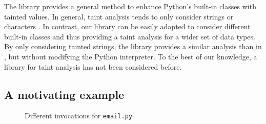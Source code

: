\documentclass[oribibl]{llncs}
\begin{document}
The library provides a general method to enhance Python's built-in
classes with tainted values. 
In general, taint
analysis tends to only consider strings or characters 
\cite{Perl,Nguyen05,Haldar05dynamictaint,KozlovPetukhov07,Futo07,SeoLam2010}.
In contrast, our library 
can be easily adapted to consider different built-in
classes
and thus providing a taint
analysis for a wider set of data types. 
By only considering tainted strings, the library provides 
a similar analysis than in \cite{KozlovPetukhov07},
but without modifying the Python interpreter.
To the best of our knowledge, a
library for taint analysis has not been considered before. 



\subsection{A motivating example}
\label{sec:example} 
%
%
%
%
\begin{figure}[t]
{\small{

\caption{\label{fig:uses} Different invocations for \texttt{email.py}}
}}
\end{figure}
\end{document}
